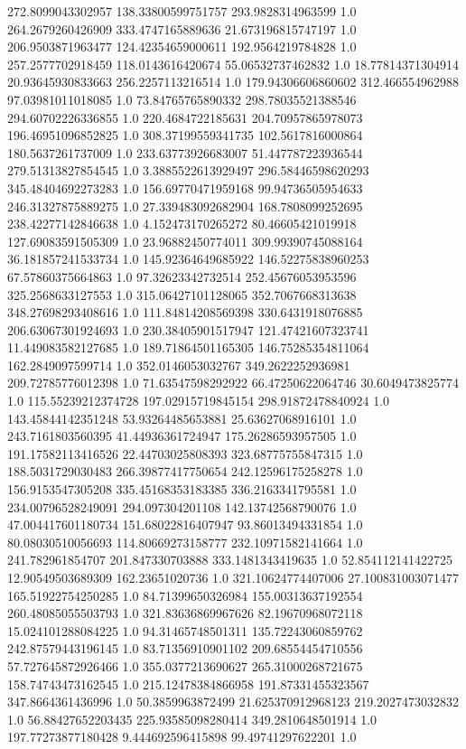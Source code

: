 272.8099043302957	138.33800599751757	293.9828314963599	1.0
264.2679260426909	333.4747165889636	21.673196815747197	1.0
206.9503871963477	124.42354659000611	192.9564219784828	1.0
257.2577702918459	118.0143616420674	55.06532737462832	1.0
18.77814371304914	20.93645930833663	256.2257113216514	1.0
179.94306606860602	312.466554962988	97.03981011018085	1.0
73.84765765890332	298.78035521388546	294.60702226336855	1.0
220.4684722185631	204.70957865978073	196.46951096852825	1.0
308.37199559341735	102.5617816000864	180.5637261737009	1.0
233.63773926683007	51.447787223936544	279.51313827854545	1.0
3.3885522613929497	296.58446598620293	345.48404692273283	1.0
156.69770471959168	99.94736505954633	246.31327875889275	1.0
27.339483092682904	168.7808099252695	238.42277142846638	1.0
4.152473170265272	80.46605421019918	127.69083591505309	1.0
23.96882450774011	309.99390745088164	36.181857241533734	1.0
145.92364649685922	146.52275838960253	67.57860375664863	1.0
97.32623342732514	252.45676053953596	325.2568633127553	1.0
315.06427101128065	352.7067668313638	348.27698293408616	1.0
111.84814208569398	330.6431918076885	206.63067301924693	1.0
230.38405901517947	121.47421607323741	11.449083582127685	1.0
189.71864501165305	146.75285354811064	162.2849097599714	1.0
352.0146053032767	349.2622252936981	209.72785776012398	1.0
71.63547598292922	66.47250622064746	30.6049473825774	1.0
115.55239212374728	197.02915719845154	298.91872478840924	1.0
143.45844142351248	53.93264485653881	25.63627068916101	1.0
243.7161803560395	41.44936361724947	175.26286593957505	1.0
191.17582113416526	22.44703025808393	323.68775755847315	1.0
188.5031729030483	266.39877417750654	242.12596175258278	1.0
156.9153547305208	335.45168353183385	336.2163341795581	1.0
234.00796528249091	294.097304201108	142.13742568790076	1.0
47.004417601180734	151.68022816407947	93.86013494331854	1.0
80.08030510056693	114.80669273158777	232.10971582141664	1.0
241.782961854707	201.847330703888	333.1481343419635	1.0
52.854112141422725	12.90549503689309	162.23651020736	1.0
321.10624774407006	27.100831003071477	165.51922754250285	1.0
84.71399650326984	155.00313637192554	260.48085055503793	1.0
321.83636869967626	82.19670968072118	15.024101288084225	1.0
94.31465748501311	135.72243060859762	242.87579443196145	1.0
83.71356910901102	209.68554454710556	57.727645872926466	1.0
355.0377213690627	265.31000268721675	158.74743473162545	1.0
215.12478384866958	191.87331455323567	347.8664361436996	1.0
50.3859963872499	21.625370912968123	219.2027473032832	1.0
56.88427652203435	225.93585098280414	349.2810648501914	1.0
197.77273877180428	9.444692596415898	99.49741297622201	1.0
